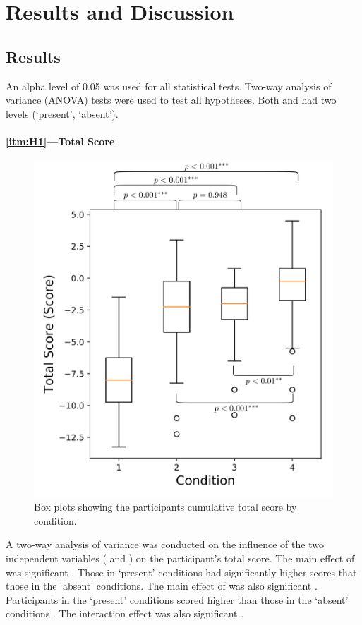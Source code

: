 \section{Results and Discussion} \label{sec:results}
\subsection{Results}
An alpha level of 0.05 was used for all statistical tests. Two-way analysis of variance (ANOVA) tests were used to test all hypotheses. Both \xQ{} and \xO had two levels (`present', `absent').

\paragraph{\ref{itm:H1}---Total Score}
       \begin{figure}[tb]
            \centering
            \includegraphics[width=0.8\linewidth]{Figures/total_score_box.png}
            \caption{Box plots showing the participants cumulative total score by condition.}
            \label{fig:score_box}
       \end{figure}
A two-way analysis of variance was conducted on the influence of the two independent variables (\xQ{} and \xO) on the participant's total score. The main effect of \xQ{} was significant . Those in \xQ{} `present'  conditions had significantly higher scores that those in the `absent'  conditions. The main effect of \xO{} was also significant . Participants in the \xO{} `present'  conditions scored higher than those in the \xO{} `absent' conditions . The interaction effect was also significant .

